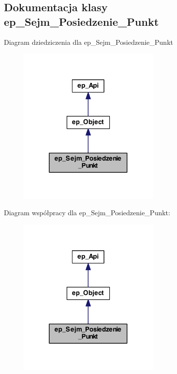 \hypertarget{classep___sejm___posiedzenie___punkt}{\subsection{Dokumentacja klasy ep\-\_\-\-Sejm\-\_\-\-Posiedzenie\-\_\-\-Punkt}
\label{classep___sejm___posiedzenie___punkt}
}


Diagram dziedziczenia dla ep\-\_\-\-Sejm\-\_\-\-Posiedzenie\-\_\-\-Punkt\nopagebreak
\begin{figure}[H]
\begin{center}
\leavevmode
\includegraphics[width=200pt]{classep___sejm___posiedzenie___punkt__inherit__graph}
\end{center}
\end{figure}


Diagram współpracy dla ep\-\_\-\-Sejm\-\_\-\-Posiedzenie\-\_\-\-Punkt\-:\nopagebreak
\begin{figure}[H]
\begin{center}
\leavevmode
\includegraphics[width=200pt]{classep___sejm___posiedzenie___punkt__coll__graph}
\end{center}
\end{figure}

